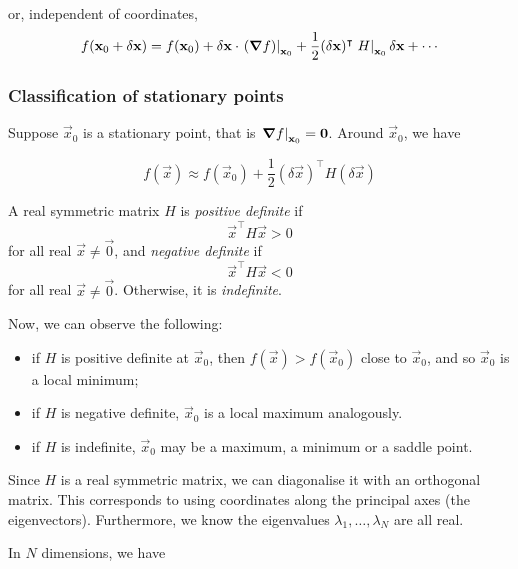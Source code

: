\documentclass{../template/note}
\begin{document}
    or, independent of coordinates,
    \begin{align*}
        f(\vec x_0 + \delta \vec x) = f(\vec x_0) + \delta \vec x \cdot \left.(\grad f)\right|_{\vec x_0} + \frac{1}{2} (\delta \vec x)^\intercal \left.H\right|_{\vec x_0} \delta \vec x + \cdots
    \end{align*}
    

    \subsubsection{Classification of stationary points}

    Suppose \(\vec x_0\) is a stationary point, that is \(\left.\grad f\right|_{\vec x_0} = \vec 0\). Around \(\vec x_0\), we have

    \[
        f(\vec x) \approx f(\vec x_0) + \frac{1}{2} (\delta \vec x)^\intercal H (\delta \vec x)
    \]
    
    \begin{definition}
        A real symmetric matrix \(H\) is \emph{positive definite} if
        \[
            \vec x^\intercal H \vec x > 0
        \]
        for all real \(\vec x \neq \vec 0\), and \emph{negative definite} if
        \[
            \vec x^\intercal H \vec x < 0
        \]
        for all real \(\vec x \neq \vec 0\). Otherwise, it is \emph{indefinite}.
    \end{definition}
    
    Now, we can observe the following:
    \begin{itemize}
        \item if \(H\) is positive definite at \(\vec x_0\), then \(f(\vec x) > f(\vec x_0)\) close to \(\vec x_0\), and so \(\vec x_0\) is a local minimum;
        \item if \(H\) is negative definite, \(\vec x_0\) is a local maximum analogously.
        \item if \(H\) is indefinite, \(\vec x_0\) may be a maximum, a minimum or a saddle point.
    \end{itemize}
    
    Since \(H\) is a real symmetric matrix, we can diagonalise it with an orthogonal matrix. This corresponds to using coordinates along the principal axes (the eigenvectors). Furthermore, we know the eigenvalues \(\lambda_1, \dots, \lambda_N\) are all real.

    In \(N\) dimensions, we have
\end{document}
